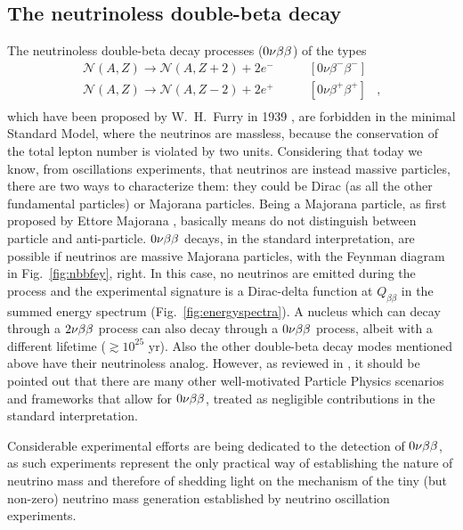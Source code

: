 \subsection*{The neutrinoless double-beta decay}
The neutrinoless double-beta decay processes ($0\nu\beta\beta$) of the types
\[
	\begin{array}{lrl}
		\mathcal{N}(A,Z)\longrightarrow \mathcal{N}(A,Z+2)+2e^- & \qquad [0\nu\beta^-\beta^-] & \\
		\mathcal{N}(A,Z)\longrightarrow \mathcal{N}(A,Z-2)+2e^+ & \qquad [0\nu\beta^+\beta^+] & , \\
	\end{array}
\]
which have been proposed by W.~H.~Furry in 1939 \cite{PhysRev.56.1184}, are forbidden in the minimal Standard Model, where the neutrinos are massless, because the conservation of the total lepton number is violated by two units. Considering that today we know, from oscillations experiments, that neutrinos are instead massive particles, there are two ways to characterize them: they could be Dirac (as all the other fundamental particles) or Majorana particles. Being a Majorana particle, as first proposed by Ettore Majorana \cite{Majorana1932}, basically means do not distinguish between particle and anti-particle. $0\nu\beta\beta$ decays, in the standard interpretation, are possible if neutrinos are massive Majorana particles, with the Feynman diagram in Fig.~\ref{fig:nbbfey}, right. In this case, no neutrinos are emitted during the process and the experimental signature is a Dirac-delta function at $Q_{\beta\beta}$ in the summed energy spectrum (Fig.~\ref{fig:energyspectra}). A nucleus which can decay through a $2\nu\beta\beta$ process can also decay through a $0\nu\beta\beta$ process, albeit with a different lifetime ($\gtrsim10^{25}$ yr). Also the other double-beta decay modes mentioned above have their neutrinoless analog. However, as reviewed in \cite{Rodejohann:2011mu}, it should be pointed out that there are many other well-motivated Particle Physics scenarios and frameworks that allow for $0\nu\beta\beta$, treated as negligible contributions in the standard interpretation.

Considerable experimental efforts are being dedicated to the detection of $0\nu\beta\beta$, as such experiments represent the only practical way of establishing the nature of neutrino mass and therefore of shedding light on the mechanism of the tiny (but non-zero) neutrino mass generation established by neutrino oscillation experiments.

